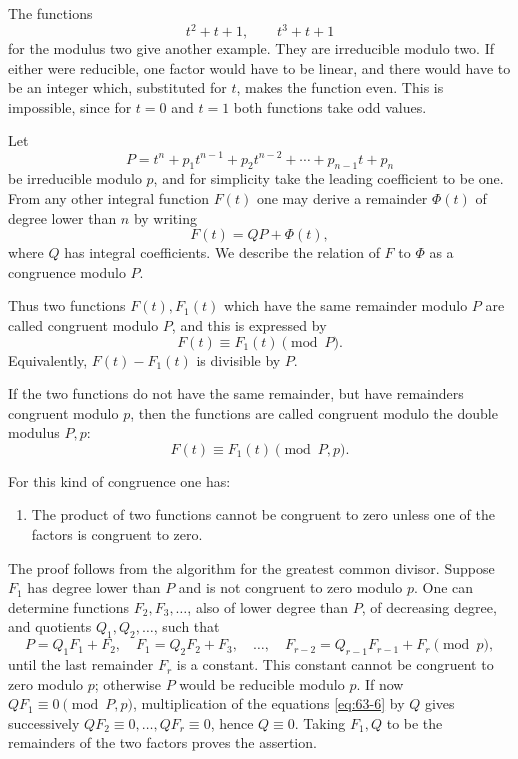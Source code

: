 \documentclass[11pt,a4paper]{book}
\begin{document}
The functions
\[
 t^2+t+1,
 \qquad t^3+t+1
\]
for the modulus two give another example.  They are irreducible modulo two.  If either were reducible, one factor would have to be linear, and there would have to be an integer which, substituted for \(t\), makes the function even.  This is impossible, since for \(t=0\) and \(t=1\) both functions take odd values.

Let
\begin{equation}\label{eq:63-3}
 P=t^n+p_1t^{n-1}+p_2t^{n-2}+\cdots+p_{n-1}t+p_n
\end{equation}
be irreducible modulo \(p\), and for simplicity take the leading coefficient to be one.  From any other integral function \(F(t)\) one may derive a remainder \(\Phi(t)\) of degree lower than \(n\) by writing
\begin{equation}\label{eq:63-4}
 F(t)=QP+\Phi(t),
\end{equation}
where \(Q\) has integral coefficients.  We describe the relation of \(F\) to \(\Phi\) as a congruence modulo \(P\).

Thus two functions \(F(t),F_1(t)\) which have the same remainder modulo \(P\) are called congruent modulo \(P\), and this is expressed by
\[
 F(t)\equiv F_1(t)\pmod P.
\]
Equivalently, \(F(t)-F_1(t)\) is divisible by \(P\).

If the two functions do not have the same remainder, but have remainders congruent modulo \(p\), then the functions are called congruent modulo the double modulus \(P,p\):
\begin{equation}\label{eq:63-5}
 F(t)\equiv F_1(t)\pmod{P,p}.
\end{equation}

For this kind of congruence one has:

\begin{enumerate}[label=\arabic*.]
\item The product of two functions cannot be congruent to zero unless one of the factors is congruent to zero.
\end{enumerate}
The proof follows from the algorithm for the greatest common divisor.  Suppose \(F_1\) has degree lower than \(P\) and is not congruent to zero modulo \(p\).  One can determine functions \(F_2,F_3,\ldots\), also of lower degree than \(P\), of decreasing degree, and quotients \(Q_1,Q_2,\ldots\), such that
\begin{equation}\label{eq:63-6}
 P=Q_1F_1+F_2,
 \quad F_1=Q_2F_2+F_3,
 \quad\ldots,
 \quad F_{r-2}=Q_{r-1}F_{r-1}+F_r
 \pmod p,
\end{equation}
until the last remainder \(F_r\) is a constant.  This constant cannot be congruent to zero modulo \(p\); otherwise \(P\) would be reducible modulo \(p\).  If now \(QF_1\equiv0\pmod{P,p}\), multiplication of the equations \eqref{eq:63-6} by \(Q\) gives successively \(QF_2\equiv0,\ldots,QF_r\equiv0\), hence \(Q\equiv0\).  Taking \(F_1,Q\) to be the remainders of the two factors proves the assertion.
\end{document}
